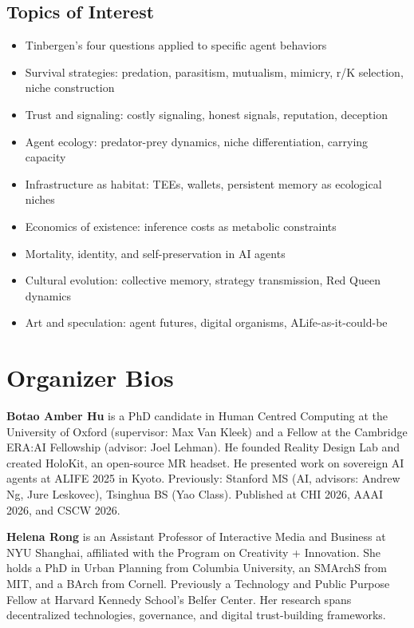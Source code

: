 \documentclass[letterpaper]{article}
\begin{document}
\subsection*{Topics of Interest}
\begin{itemize}[nosep]
\item Tinbergen's four questions applied to specific agent behaviors
\item Survival strategies: predation, parasitism, mutualism, mimicry, r/K selection, niche construction
\item Trust and signaling: costly signaling, honest signals, reputation, deception
\item Agent ecology: predator-prey dynamics, niche differentiation, carrying capacity
\item Infrastructure as habitat: TEEs, wallets, persistent memory as ecological niches
\item Economics of existence: inference costs as metabolic constraints
\item Mortality, identity, and self-preservation in AI agents
\item Cultural evolution: collective memory, strategy transmission, Red Queen dynamics
\item Art and speculation: agent futures, digital organisms, ALife-as-it-could-be
\end{itemize}

\section{Organizer Bios}

\textbf{Botao Amber Hu} is a PhD candidate in Human Centred Computing at the University of Oxford (supervisor: Max Van Kleek) and a Fellow at the Cambridge ERA:AI Fellowship (advisor: Joel Lehman). He founded Reality Design Lab and created HoloKit, an open-source MR headset. He presented work on sovereign AI agents at ALIFE 2025 in Kyoto. Previously: Stanford MS (AI, advisors: Andrew Ng, Jure Leskovec), Tsinghua BS (Yao Class). Published at CHI 2026, AAAI 2026, and CSCW 2026.

\textbf{Helena Rong} is an Assistant Professor of Interactive Media and Business at NYU Shanghai, affiliated with the Program on Creativity + Innovation. She holds a PhD in Urban Planning from Columbia University, an SMArchS from MIT, and a BArch from Cornell. Previously a Technology and Public Purpose Fellow at Harvard Kennedy School's Belfer Center. Her research spans decentralized technologies, governance, and digital trust-building frameworks.
\end{document}

